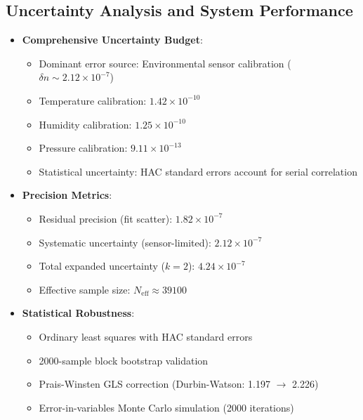\documentclass[aip,reprint,groupedaddress,onecolumn,superscriptaddress]{revtex4-2}
\begin{document}
\subsection{Uncertainty Analysis and System Performance}
\begin{itemize}
    \item \textbf{Comprehensive Uncertainty Budget}:
    \begin{itemize}
        \item Dominant error source: Environmental sensor calibration ($\delta n \sim 2.12\times10^{-7}$)
        \item Temperature calibration: $1.42 \times 10^{-10}$
        \item Humidity calibration: $1.25 \times 10^{-10}$
        \item Pressure calibration: $9.11 \times 10^{-13}$
        \item Statistical uncertainty: HAC standard errors account for serial correlation
    \end{itemize}
    
    \item \textbf{Precision Metrics}:
    \begin{itemize}
        \item Residual precision (fit scatter): $1.82 \times 10^{-7}$
        \item Systematic uncertainty (sensor-limited): $2.12 \times 10^{-7}$
        \item Total expanded uncertainty ($k=2$): $4.24 \times 10^{-7}$
        \item Effective sample size: $N_{\text{eff}} \approx \num{39100}$
    \end{itemize}
    
    \item \textbf{Statistical Robustness}:
    \begin{itemize}
        \item Ordinary least squares with HAC standard errors
        \item \num{2000}-sample block bootstrap validation
        \item Prais-Winsten GLS correction (Durbin-Watson: 1.197 $\rightarrow$ 2.226)
        \item Error-in-variables Monte Carlo simulation (\num{2000} iterations)
    \end{itemize}
\end{itemize}

\end{document}

